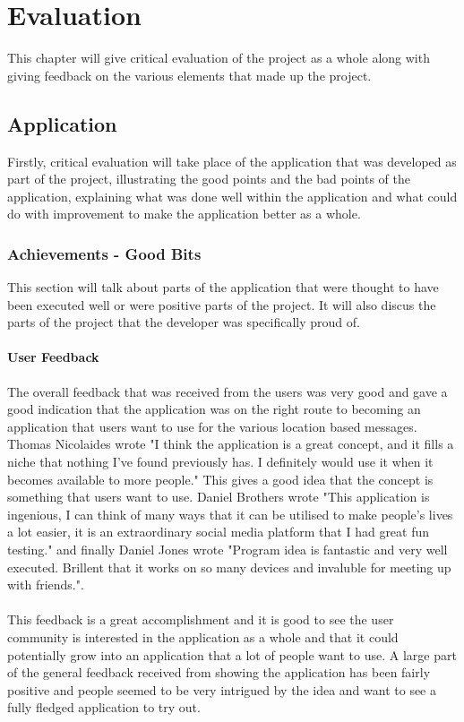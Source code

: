 \chapter{Evaluation}

This chapter will give critical evaluation of the project as a whole along with giving feedback on the various elements that made up the project.

\section{Application}

Firstly, critical evaluation will take place of the application that was developed as part of the project, illustrating the good points and the bad points of the application, explaining what was done well within the application and what could do with improvement to make the application better as a whole.

\subsection{Achievements - Good Bits}

This section will talk about parts of the application that were thought to have been executed well or were positive parts of the project. It will also discus the parts of the project that the developer was specifically proud of.

\subsubsection{User Feedback}

The overall feedback that was received from the users was very good and gave a good indication that the application was on the right route to becoming an application that users want to use for the various location based messages. Thomas Nicolaides wrote "I think the application is a great concept, and it fills a niche that nothing I've found previously has. I definitely would use it when it becomes available to more people." This gives a good idea that the concept is something that users want to use. Daniel Brothers wrote "This application is ingenious, I can think of many ways that it can be utilised to make people's lives a lot easier, it is an extraordinary social media platform that I had great fun testing." and finally Daniel Jones wrote "Program idea is fantastic and very well executed. Brillent that it works on so many devices and invaluble for meeting up with friends.".\\
\\
This feedback is a great accomplishment and it is good to see the user community is interested in the application as a whole and that it could potentially grow into an application that a lot of people want to use. A large part of the general feedback received from showing the application has been fairly positive and people seemed to be very intrigued by the idea and want to see a fully fledged application to try out.


